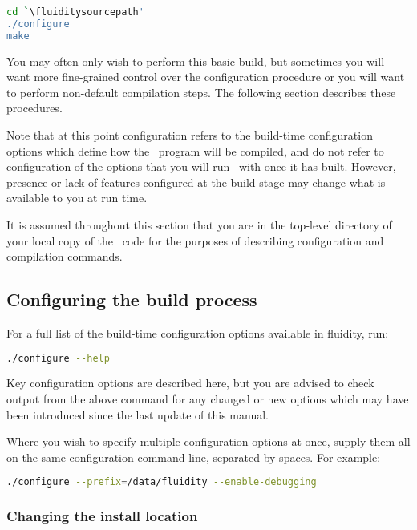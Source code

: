 \begin{lstlisting}[language=Bash]
cd `\fluiditysourcepath' 
./configure
make
\end{lstlisting}

You may often only wish to perform this basic build, but sometimes you will
want more fine-grained control over the configuration procedure or you will
want to perform non-default compilation steps. The following section describes
these procedures.

Note that at this point configuration refers to the build-time configuration
options which define how the \fluidity\ program will be compiled, and do not
refer to configuration of the options that you will run \fluidity\ with once it 
has built. However, presence or lack of features configured at the build stage
may change what is available to you at run time.

It is assumed throughout this section that you are in the top-level directory
of your local copy of the \fluidity\ code for the purposes of describing
configuration and compilation commands.

\subsection{Configuring the build process}
\label{sect:configuring_the_build_process}

For a full list of the build-time configuration options available in fluidity,
run:

\begin{lstlisting}[language=Bash]
./configure --help
\end{lstlisting}

Key configuration options are described here, but you are advised to check
output from the above command for any changed or new options which may have
been introduced since the last update of this manual.

Where you wish to specify multiple configuration options at once, supply them
all on the same configuration command line, separated by spaces. For example:

\begin{lstlisting}[language=Bash]
./configure --prefix=/data/fluidity --enable-debugging
\end{lstlisting}

\subsubsection{Changing the install location}
\label{sect:configure_change_install_location}

